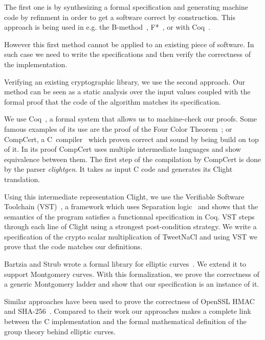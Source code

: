 The first one is by synthesizing a formal specification and generating machine
code by refinment in order to get a software correct by construction.
This approach is being used in e.g. the B-method~\cite{Abrial:1996:BAP:236705},
F*~\cite{DBLP:journals/corr/BhargavanDFHPRR17}, or with Coq~\cite{CpdtJFR}.

However this first method cannot be applied to an existing piece of software.
In such case we need to write the specifications and then verify the correctness
of the implementation.

Verifying an existing cryptographic library, we use the second approach.
Our method can be seen as a static analysis over the input values coupled
with the formal proof that the code of the algorithm matches its specification.

We use Coq~\cite{coq-faq}, a formal system that allows us to machine-check our proofs.
Some famous examples of its use are the proof of the Four Color Theorem~\cite{gonthier2008formal}; or
CompCert, a C~compiler~\cite{Leroy-backend} which proven correct and sound by being build on top of it.
In its proof CompCert uses multiple intermediate languages and show equivalence between them.
The first step of the compilation by CompCert is done by the parser \textit{clightgen}.
It takes as input C code and generates its Clight~\cite{Blazy-Leroy-Clight-09} translation.

Using this intermediate representation Clight, we use the Verifiable Software Toolchain
(VST)~\cite{2012-Appel}, a framework which uses Separation logic~\cite{1969-Hoare,Reynolds02separationlogic}
and shows that the semantics of the program satisfies a functionnal specification in Coq.
VST steps through each line of Clight using a strongest post-condition strategy.
We write a specification of the crypto scalar multiplication of TweetNaCl and using
VST we prove that the code matches our definitions.

Bartzia and Strub wrote a formal library for elliptic curves~\cite{DBLP:conf/itp/BartziaS14}.
We extend it to support Montgomery curves. With this formalization, we prove the
correctness of a generic Montgomery ladder and show that our specification is an instance of it.



Similar approaches have been used to prove the correctness of OpenSSL HMAC~\cite{Beringer2015VerifiedCA}
and SHA-256~\cite{2015-Appel}. Compared to their work
our approaches makes a complete link between the C implementation and the formal
mathematical definition of the group theory behind elliptic curves.

